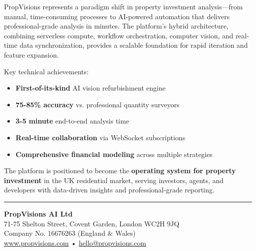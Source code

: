 \documentclass[11pt,a4paper]{article}
\begin{document}
PropVisions represents a paradigm shift in property investment analysis—from manual, time-consuming processes to AI-powered automation that delivers professional-grade analysis in minutes. The platform's hybrid architecture, combining serverless compute, workflow orchestration, computer vision, and real-time data synchronization, provides a scalable foundation for rapid iteration and feature expansion.

Key technical achievements:
\begin{itemize}
  \item \textbf{First-of-its-kind} AI vision refurbishment engine
  \item \textbf{75-85\% accuracy} vs. professional quantity surveyors
  \item \textbf{3-5 minute} end-to-end analysis time
  \item \textbf{Real-time collaboration} via WebSocket subscriptions
  \item \textbf{Comprehensive financial modeling} across multiple strategies
\end{itemize}

The platform is positioned to become the \textbf{operating system for property investment} in the UK residential market, serving investors, agents, and developers with data-driven insights and professional-grade reporting.

\vspace{1cm}

\noindent\rule{\textwidth}{0.4pt}

\vspace{0.5cm}

\noindent\textbf{PropVisions AI Ltd} \\
71-75 Shelton Street, Covent Garden, London WC2H 9JQ \\
Company No. 16676263 (England \& Wales) \\
\href{https://www.propvisions.com}{www.propvisions.com} • \href{mailto:hello@propvisions.com}{hello@propvisions.com}
\end{document}
